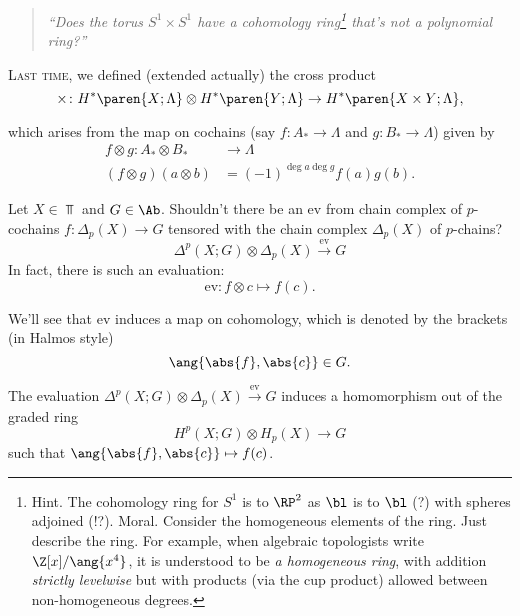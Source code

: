 \begin{quote}
   \textit{``Does the torus $S^1 \times S^1$ have a cohomology ring\footnote{\textsf{Hint.} The cohomology ring for $S^1$ is to $\RP^2$ as $\bl$ is to $\bl$ (?) with spheres adjoined (!?). \textsf{Moral.} Consider the homogeneous elements of the ring. Just describe the ring. For example, when algebraic topologists write $\Z[x]/\ang{x^4}$, it is understood to be \emph{a homogeneous ring}, with addition \emph{strictly levelwise} but with products (via the cup product) allowed between non-homogeneous degrees.} 
   that's not a polynomial ring?''}
\end{quote}


\newcommand{\coho}[2]{H^*\paren{ #1; #2 }}

\textsc{Last time}, we defined (extended actually) the cross product
\[
    \times \colon H^*\paren{ X; \Lambda } \otimes \coho{Y}{\Lambda} \to \coho{X\times Y}{\Lambda}
,\]

which arises from the map on cochains (say $f\colon A_* \to \Lambda$ and $g\colon B_* \to \Lambda$) given by
\begin{align*}
    f \otimes g \colon  A_* \otimes B_* & \to \Lambda\\
    (f \otimes g)(a \otimes b) &= (-1)^{\deg a \deg g} f(a) g(b).
\end{align*}

\renewcommand{\ev}{\mathrm{ev}}

\begin{defn}
   Let $X \in \Top$ and $G \in \Ab$. Shouldn't there be an  $\ev$ from chain complex of $p$-cochains $f \colon \Delta_p(X) \to G$ tensored with the chain complex $\Delta_p(X)$ of $p$-chains? 
    \[
        \Delta^p(X; G) \otimes \Delta_p(X) \xrightarrow{\ev} G
    \]
    In fact, there is such an evaluation:
    \[
     \ev\colon f \otimes c \mapsto f(c).
    \] 
\end{defn}

We'll see that $\ev$ induces a map on cohomology, which is denoted by the brackets (in Halmos style) 
\[
   \ang{\abs{f}, \abs{ c }} \in G.
\]

\begin{lem}
   The evaluation $\Delta^p(X; G) \otimes \Delta_p(X) \xrightarrow{\ev} G$ induces a homomorphism out of the graded ring
   \begin{equation}
       \label{kpairing}
       H^p(X;G) \otimes H_p(X) \to G
   \end{equation}
   such that $\ang{\abs{f}, \abs{ c }}\mapsto f(c)$.
\end{lem}

